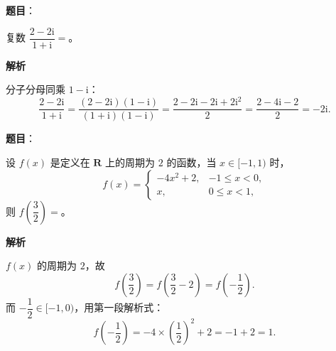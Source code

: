 \begin{answer}

\textbf{题目}：

复数 $\dfrac{2-2\mathrm i}{1+\mathrm i}=$\gkblank{}。

\textbf{解析}

分子分母同乘 $1-\mathrm i$：
\nopagebreak[4]
\[\frac{2-2\mathrm i}{1+\mathrm i}
=\frac{(2-2\mathrm i)(1-\mathrm i)}{(1+\mathrm i)(1-\mathrm i)}
=\frac{2-2\mathrm i-2\mathrm i+2\mathrm i^2}{2}
=\frac{2-4\mathrm i-2}{2}=-2\mathrm i .\]


\end{answer}
\begin{answer}

\textbf{题目}：

设 $f(x)$ 是定义在 $\mathbf R$ 上的周期为 $2$ 的函数，当 $x\in[-1,1)$ 时，
\nopagebreak[4]
\[f(x)=\begin{cases}-4x^2+2,&-1\leqslant x<0,\\x,&0\leqslant x<1,\end{cases}\]
则 $f\left(\dfrac32\right)=$\gkblank{}。

\textbf{解析}

$f(x)$ 的周期为 $2$，故
\nopagebreak[4]
\[f\left(\frac32\right)=f\left(\frac32-2\right)=f\left(-\frac12\right).\]
而 $-\dfrac12\in[-1,0)$，用第一段解析式：
\nopagebreak[4]
\[f\left(-\frac12\right)=-4\times\left(\frac12\right)^2+2=-1+2=1 .\]


\end{answer}
